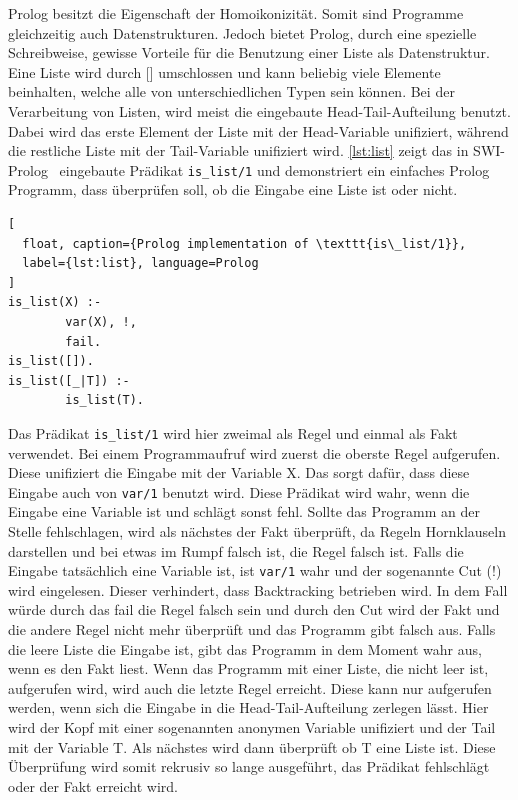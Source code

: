 Prolog besitzt die Eigenschaft der Homoikonizität. Somit sind Programme gleichzeitig auch Datenstrukturen. 
Jedoch bietet Prolog, durch eine spezielle Schreibweise, gewisse Vorteile für die Benutzung einer Liste als Datenstruktur.
Eine Liste wird durch [] umschlossen und
kann beliebig viele Elemente beinhalten, welche alle von unterschiedlichen Typen sein können.
Bei der Verarbeitung von Listen, wird meist die eingebaute Head-Tail-Aufteilung benutzt. Dabei wird das erste Element der Liste
mit der Head-Variable unifiziert, während die restliche Liste mit der Tail-Variable unifiziert wird.
\cref{lst:list} zeigt das in SWI-Prolog~\cite{wielemaker:2011:tplp} eingebaute Prädikat \texttt{is\_list/1} und
demonstriert ein einfaches Prolog Programm, dass überprüfen soll, ob die Eingabe eine Liste ist oder nicht.
\begin{lstlisting}[
  float, caption={Prolog implementation of \texttt{is\_list/1}},
  label={lst:list}, language=Prolog
]
is_list(X) :-
        var(X), !,
        fail.
is_list([]).
is_list([_|T]) :-
        is_list(T).
\end{lstlisting}
Das Prädikat \texttt{is\_list/1} wird hier zweimal als Regel und einmal als Fakt verwendet.
Bei einem Programmaufruf wird zuerst die oberste Regel aufgerufen. Diese unifiziert die Eingabe mit der Variable
X. Das sorgt dafür, dass diese Eingabe auch von \texttt{var/1} benutzt wird. Diese Prädikat wird wahr, wenn die Eingabe
eine Variable ist und schlägt sonst fehl.
Sollte das Programm an der Stelle fehlschlagen, wird als nächstes der Fakt überprüft, da Regeln Hornklauseln
darstellen und bei etwas im Rumpf falsch ist, die Regel falsch ist.
Falls die Eingabe tatsächlich eine Variable ist, ist \texttt{var/1} wahr und der sogenannte Cut (!) wird eingelesen.
Dieser verhindert, dass Backtracking betrieben wird. In dem Fall würde durch das fail die Regel falsch sein und durch den Cut
wird der Fakt und die andere Regel nicht mehr überprüft und das Programm gibt falsch aus.
Falls die leere Liste die Eingabe ist, gibt das Programm in dem Moment wahr aus, wenn es den Fakt liest.
Wenn das Programm mit einer Liste, die nicht leer ist, aufgerufen wird, wird auch die letzte Regel erreicht.
Diese kann nur aufgerufen werden, wenn sich die Eingabe in die Head-Tail-Aufteilung zerlegen lässt.
Hier wird der Kopf mit einer sogenannten anonymen Variable unifiziert und der Tail mit der Variable T.
Als nächstes wird dann überprüft ob T eine Liste ist. Diese Überprüfung wird somit rekrusiv so lange ausgeführt,
das Prädikat fehlschlägt oder der Fakt erreicht wird. 